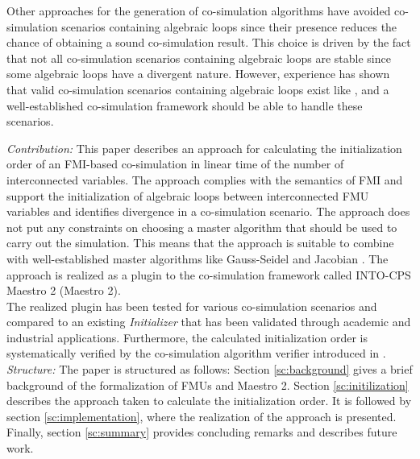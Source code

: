 \noindent Other approaches for the generation of co-simulation algorithms have avoided co-simulation scenarios containing algebraic loops since their presence reduces the chance of obtaining a sound co-simulation result\cite{Amalio2016CheckingCo-simulation, BromanCompositionCo-Simulation}. This choice is driven by the fact that not all co-simulation scenarios containing algebraic loops are stable since some algebraic loops have a divergent nature. However, experience has shown that valid co-simulation scenarios containing algebraic loops exist like , and a well-established co-simulation framework should be able to handle these scenarios. 

\textit{Contribution:} This paper describes an approach for calculating the initialization order of an FMI-based co-simulation in linear time of the number of interconnected variables. The approach complies with the semantics of FMI and support the initialization of algebraic loops between interconnected FMU variables and identifies divergence in a co-simulation scenario. The approach does not put any constraints on choosing a master algorithm that should be used to carry out the simulation. This means that the approach is suitable to combine with well-established master algorithms like Gauss-Seidel and Jacobian \cite{Palensky2017}. The approach is realized as a plugin to the co-simulation framework called INTO-CPS Maestro 2 (Maestro 2). \\
The realized plugin has been tested for various co-simulation scenarios and compared to an existing \textit{Initializer} that has been validated through academic and industrial applications. 
Furthermore, the calculated initialization order is systematically verified by the co-simulation algorithm verifier introduced in \cite{gomes_lucio_vangheluwe_2019}. \\

\textit{Structure:} The paper is structured as follows: Section \ref{sc:background} gives a brief background of the formalization of FMUs and Maestro 2. Section \ref{sc:initilization} describes the approach taken to calculate the initialization order. It is followed by section \ref{sc:implementation}, where the realization of the approach is presented. Finally, section \ref{sc:summary} provides concluding remarks and describes future work.